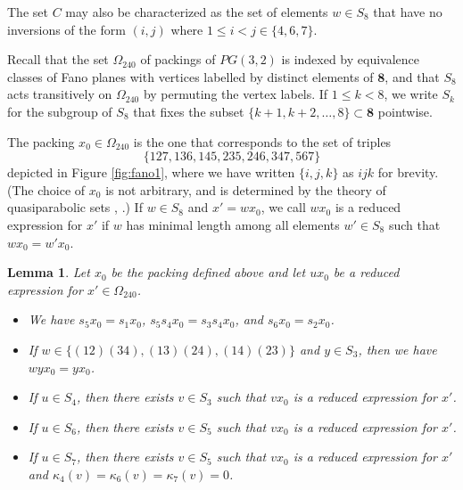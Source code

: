 \documentclass{amsart}
\theoremstyle{plain}
\newtheorem{lemma}[theorem]{Lemma}
\theoremstyle{definition}
\theoremstyle{remark}
\numberwithin{equation}{section}
\newcommand{\eight}{{\mathbf 8}}
\newcommand{\qpx}{\Omega_{240}}
\newcommand{\leh}{\kappa}
\begin{document}
The set $C$ may also be characterized as the set of elements $w \in S_8$ that have no inversions of the form
$(i, j)$ where $1 \leq i < j \in \{4, 6, 7\}$.

Recall that the set $\qpx$ of packings of $PG(3, 2)$ is indexed by equivalence classes of Fano planes with
vertices labelled by distinct elements of $\eight$, and that $S_8$ acts transitively on $\qpx$ by permuting
the vertex labels. If $1 \leq k < 8$, we write $S_k$ for the subgroup of $S_8$ that fixes the subset 
$\{k+1, k+2, \ldots, 8\} \subset \eight$ pointwise.

The packing $x_0 \in \qpx$ is the one that corresponds to the set of triples $$
\{127, 136, 145, 235, 246, 347, 567\}
$$ depicted in Figure \ref{fig:fano1}, where we have written $\{i, j, k\}$ as $ijk$ for brevity. 
(The choice of $x_0$ is not arbitrary, and is determined by the theory of quasiparabolic sets \cite{rains13},
\cite[Proposition 6.5]{gx5}.) If $w \in S_8$ and $x' =  wx_0$,
we call $w x_0$ is a reduced expression for $x'$ if $w$ has minimal length among all elements $w' \in S_8$ such that 
$wx_0 = w'x_0$.

\begin{lemma}\label{lem:x0}
Let $x_0$ be the packing defined above and let $ux_0$ be a reduced expression for $x' \in \qpx$.
\begin{itemize}
\item[{\rm (i)}]{We have $s_5 x_0 = s_1 x_0$, $s_5 s_4 x_0 = s_3 s_4 x_0$, and $s_6 x_0 = s_2 x_0$.}
\item[{\rm (ii)}]{If $w \in \{(12)(34), (13)(24), (14)(23)\}$ and $y \in S_3$, then we have $wy x_0 = yx_0$.}
\item[{\rm (iii)}]{If $u \in S_4$, then there exists $v \in S_3$ such that
$vx_0$ is a reduced expression for $x'$.}
\item[{\rm (iv)}]{If $u \in S_6$, then there exists $v \in S_5$ such that
$v x_0$ is a reduced expression for $x'$.}
\item[{\rm (v)}]{If $u \in S_7$, then there exists $v \in S_5$ such that
$vx_0$ is a reduced expression for $x'$ and $\leh_4(v)=\leh_6(v)=\leh_7(v)=0$.}
\end{itemize}
\end{lemma}
\end{document}
